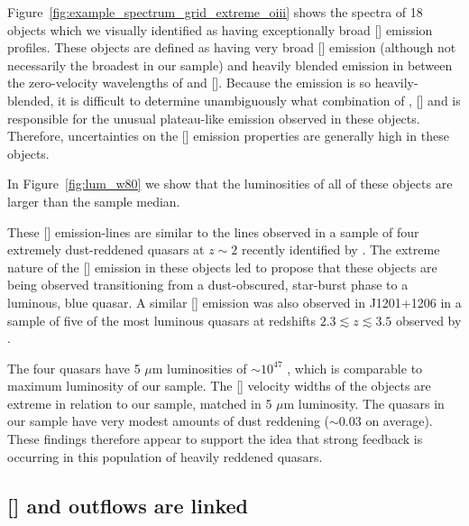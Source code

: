 Figure~\ref{fig:example_spectrum_grid_extreme_oiii} shows the spectra of 18 objects which we visually identified as having exceptionally broad [] emission profiles. 
These objects are defined as having very broad [] emission (although not necessarily the broadest in our sample) and heavily blended emission in between the zero-velocity wavelengths of \hb and []. 
Because the emission is so heavily-blended, it is difficult to determine unambiguously what combination of \hb, [] and  is responsible for the unusual plateau-like emission observed in these objects. 
Therefore, uncertainties on the [] emission properties are generally high in these objects. 

In Figure~\ref{fig:lum_w80} we show that the luminosities of all of these objects are larger than the sample median.

These [] emission-lines are similar to the lines observed in a sample of four extremely dust-reddened quasars at $z\sim2$ recently identified by \citet{zakamska16}. 
The extreme nature of the [] emission in these objects led \citet{zakamska16} to propose that these objects are being observed transitioning from a dust-obscured, star-burst phase to a luminous, blue quasar. 
A similar [] emission was also observed in J1201+1206 in a sample of five of the most luminous quasars at redshifts $2.3 \lesssim z \lesssim 3.5$ observed by \citet{bischetti16}. 

The four \citet{zakamska16} quasars have 5 $\mu$m luminosities of $\sim10^{47}$ \ergs, which is comparable to maximum luminosity of our sample.
The [] velocity widths of the \citet{zakamska16} objects are extreme in relation to our sample, matched in 5 $\mu$m luminosity.
The quasars in our sample have very modest amounts of dust reddening (\ebv $\sim0.03$ on average). 
These findings therefore appear to support the idea that strong feedback is occurring in this population of heavily reddened quasars. 

\subsection{[] and  outflows are linked}

